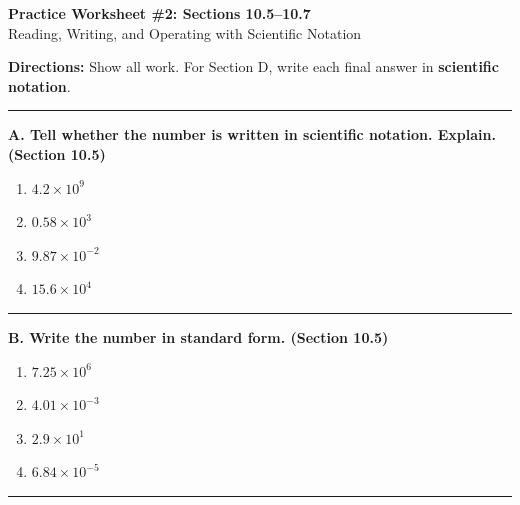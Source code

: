 \documentclass[11pt]{article}
\newcommand{\work}[1]{\vspace{#1}}
\begin{document}
\begin{center}
{\Large \textbf{Practice Worksheet \#2: Sections 10.5--10.7}}\\[4pt]
{\small Reading, Writing, and Operating with Scientific Notation}
\end{center}

\textbf{Directions:} Show all work. For Section D, write each final answer in \textbf{scientific notation}.

\vspace{0.4em}
\hrule
\vspace{0.9em}

\textbf{A. Tell whether the number is written in scientific notation. Explain. (Section 10.5)}

\begin{enumerate}
\item $4.2 \times 10^{9}$
\work{1in}

\item $0.58 \times 10^{3}$
\work{1in}

\item $9.87 \times 10^{-2}$
\work{1in}

\item $15.6 \times 10^{4}$
\work{1in}
\end{enumerate}

\vspace{0.2em}
\hrule
\vspace{0.9em}

\textbf{B. Write the number in standard form. (Section 10.5)}

\begin{enumerate}[resume]
\item $7.25 \times 10^{6}$
\work{1.1in}

\item $4.01 \times 10^{-3}$
\work{1.1in}

\item $2.9 \times 10^{1}$
\work{1.1in}

\item $6.84 \times 10^{-5}$
\work{1.1in}
\end{enumerate}

\vspace{0.2em}
\hrule
\vspace{0.9em}
\end{document}
